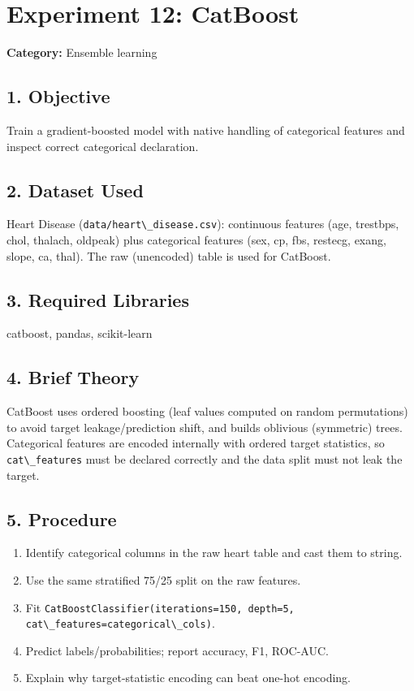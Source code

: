 \chapter{Experiment 12: CatBoost}\label{experiment-12-catboost}

\textbf{Category:} Ensemble learning

\section{1. Objective}\label{objective-4}

Train a gradient-boosted model with native handling of categorical
features and inspect correct categorical declaration.

\section{2. Dataset Used}\label{dataset-used-4}

Heart Disease (\passthrough{\lstinline!data/heart\_disease.csv!}):
continuous features (age, trestbps, chol, thalach, oldpeak) plus
categorical features (sex, cp, fbs, restecg, exang, slope, ca, thal).
The raw (unencoded) table is used for CatBoost.

\section{3. Required Libraries}\label{required-libraries-4}

catboost, pandas, scikit-learn

\section{4. Brief Theory}\label{brief-theory-4}

CatBoost uses ordered boosting (leaf values computed on random
permutations) to avoid target leakage/prediction shift, and builds
oblivious (symmetric) trees. Categorical features are encoded internally
with ordered target statistics, so
\passthrough{\lstinline!cat\_features!} must be declared correctly and
the data split must not leak the target.

\section{5. Procedure}\label{procedure-4}

\begin{enumerate}
\def\labelenumi{\arabic{enumi}.}
\tightlist
\item
  Identify categorical columns in the raw heart table and cast them to
  string.
\item
  Use the same stratified 75/25 split on the raw features.
\item
  Fit
  \passthrough{\lstinline!CatBoostClassifier(iterations=150, depth=5, cat\_features=categorical\_cols)!}.
\item
  Predict labels/probabilities; report accuracy, F1, ROC-AUC.
\item
  Explain why target-statistic encoding can beat one-hot encoding.
\end{enumerate}

